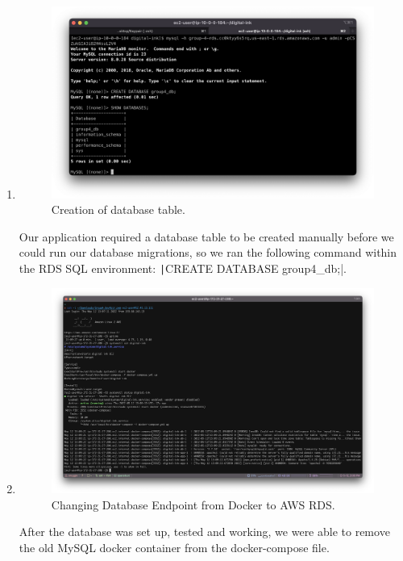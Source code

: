 \begin{enumerate}
    \item
    \begin{figure}[H]
    \centering
    \includegraphics[width=\textwidth]{resources/rds/rds-database-creation}
    \caption{Creation of database table.}
    \label{fig:rds-db-create-2}
    \end{figure}\nolinebreak
    Our application required a database table to be created manually before we could run our database migrations, so we ran the following command within the RDS SQL environment: \texttt|CREATE DATABASE group4_db;|.

    \item
    \begin{figure}[H]
        \centering
        \includegraphics[width=\textwidth]{resources/rds/envupdate}
        \caption{Changing Database Endpoint from Docker to AWS RDS.}
        \label{fig:rds-env-update}
    \end{figure}\nolinebreak
    After the database was set up, tested and working, we were able to remove the old MySQL docker container from the
    docker-compose file.


\end{enumerate}
